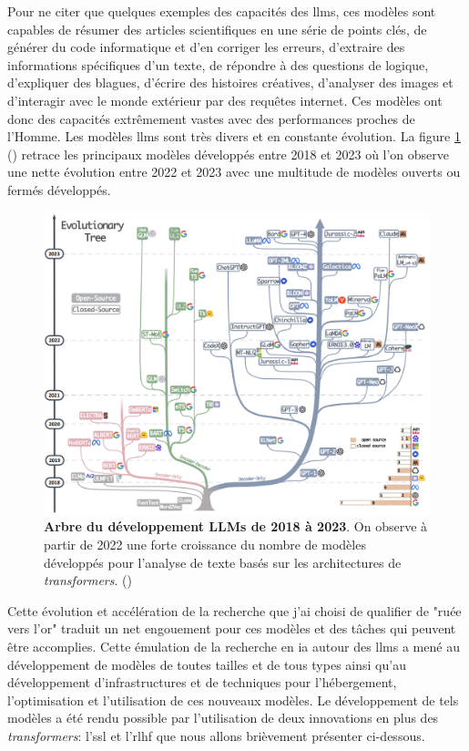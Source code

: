 Pour ne citer que quelques exemples des capacités des \gls{llms}, ces modèles sont capables de résumer des articles scientifiques en une série de points clés, de générer du code informatique et d'en corriger les erreurs, d'extraire des informations spécifiques d'un texte, de répondre à des questions de logique, d'expliquer des blagues, d'écrire des histoires créatives, d'analyser des images et d'interagir avec le monde extérieur par des requêtes internet. Ces modèles ont donc des capacités extrêmement vastes avec des performances proches de l'Homme. Les modèles \gls{llms} sont très divers et en constante évolution. La figure \ref{fig:llm-tree} (\cite{yang_harnessing_2023}) retrace les principaux modèles développés entre 2018 et 2023 où l'on observe une nette évolution entre 2022 et 2023 avec une multitude de modèles ouverts ou fermés développés. 
\begin{figure}[!ht]
 \centering
 \includegraphics[width=1\textwidth]{figures/llm_tree.png}
 \caption[Arbre du développement LLMs de 2018 à 2023 (\cite{yang_harnessing_2023})]{\textbf{Arbre du développement LLMs de 2018 à 2023}. On observe à partir de 2022 une forte croissance du nombre de modèles développés pour l'analyse de texte basés sur les architectures de \textit{transformers}. (\cite{yang_harnessing_2023})}
 \label{fig:llm-tree}
\end{figure}
Cette évolution et accélération de la recherche que j'ai choisi de qualifier de "ruée vers l'or" traduit un net engouement pour ces modèles et des tâches qui peuvent être accomplies. Cette émulation de la recherche en \gls{ia} autour des \gls{llms} a mené au développement de modèles de toutes tailles et de tous types ainsi qu'au développement d'infrastructures et de techniques pour l'hébergement, l'optimisation et l'utilisation de ces nouveaux modèles. Le développement de tels modèles a été rendu possible par l'utilisation de deux innovations en plus des \textit{transformers}: l'\gls{ssl} et l'\gls{rlhf} que nous allons brièvement présenter ci-dessous.


